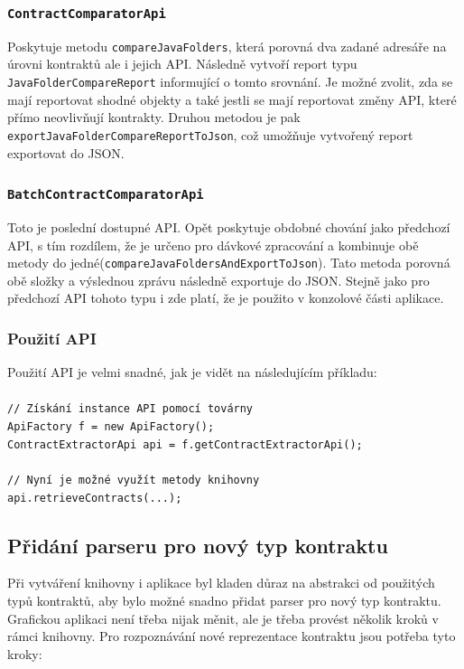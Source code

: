 			\subsubsection{\texttt{ContractComparatorApi}}
				Poskytuje metodu \texttt{compareJavaFolders}, která porovná dva zadané adresáře na úrovni kontraktů ale i jejich API. Následně vytvoří report typu \texttt{JavaFolderCompareReport} informující o tomto srovnání. Je možné zvolit, zda se mají reportovat shodné objekty a také jestli se mají reportovat změny API, které přímo neovlivňují kontrakty. Druhou metodou je pak \texttt{exportJavaFolderCompareReportToJson}, což umožňuje vytvořený report exportovat do JSON.
				
			\subsubsection{\texttt{BatchContractComparatorApi}}
				Toto je poslední dostupné API. Opět poskytuje obdobné chování jako předchozí API, s tím rozdílem, že je určeno pro dávkové zpracování a kombinuje obě metody do jedné(\texttt{compareJavaFoldersAndExportToJson}). Tato metoda porovná obě složky a výslednou zprávu následně exportuje do JSON. Stejně jako pro předchozí API tohoto typu i zde platí, že je použito v konzolové části aplikace.
				
			\subsubsection{Použití API}	    
				Použití API je velmi snadné, jak je vidět na následujícím příkladu:\\\\
				\- \- \- \- \- \- \texttt{\textcolor{pgrey}{// Získání instance API pomocí továrny}}\\ 
				\- \- \- \- \- \- \texttt{ApiFactory f = new ApiFactory();}\\
	    		\- \- \- \- \- \- \texttt{ContractExtractorApi api = f.getContractExtractorApi();}\\\\ 
            	\- \- \- \- \- \- \texttt{\textcolor{pgrey}{// Nyní je možné využít metody knihovny}}\\ 
				\- \- \- \- \- \- \texttt{api.retrieveContracts(...);}
	    
	    \subsection{Přidání parseru pro nový typ kontraktu}
	    	Při vytváření knihovny i aplikace byl kladen důraz na abstrakci od použitých typů kontraktů, aby bylo možné snadno přidat parser pro nový typ kontraktu. Grafickou aplikaci není třeba nijak měnit, ale je třeba provést několik kroků v rámci knihovny. Pro rozpoznávání nové reprezentace kontraktu jsou potřeba tyto kroky:
	    	
